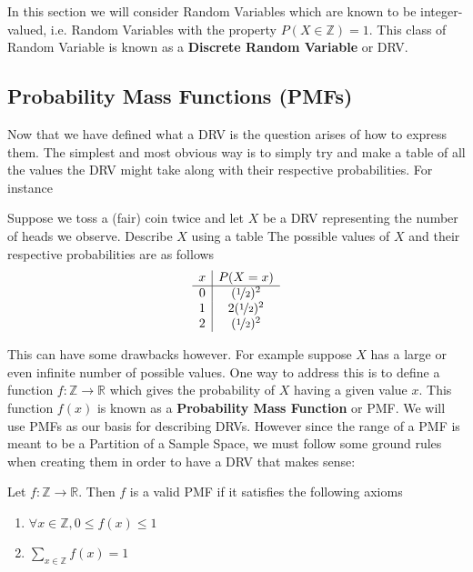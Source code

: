 \documentclass{report}
\begin{document}
In this section we will consider Random Variables which are known to be integer-valued, i.e. Random Variables with the property $P(X\in\mathbb Z)=1$. This class of Random Variable is known as a \textbf{Discrete Random Variable} or DRV.

\subsection{Probability Mass Functions (PMFs)}
Now that we have defined what a DRV is the question arises of how to express them. The simplest and most obvious way is to simply try and make a table of all the values the DRV might take along with their respective probabilities. For instance
\begin{example}
    Suppose we toss a (fair) coin twice and let $X$ be a DRV representing the number of heads we observe. Describe $X$ using a table
    \solution
    The possible values of $X$ and their respective probabilities are as follows
        \[
            \begin{array}{c|c}
                x & P(X=x) \\
                \hline
                0 & (\nicefrac 12)^2 \\
                1 & 2(\nicefrac 12)^2 \\
                2 & (\nicefrac 12)^2 
            \end{array}
        \]
\end{example}
This can have some drawbacks however. For example suppose $X$ has a large or even infinite number of possible values. One way to address this is to define a function $f: \mathbb Z\to \mathbb R$ which gives the probability of $X$ having a given value $x$. This function $f(x)$ is known as a \textbf{Probability Mass Function} or PMF. We will use PMFs as our basis for describing DRVs. However since the range of a PMF is meant to be a Partition of a Sample Space, we must follow some ground rules when creating them in order to have a DRV that makes sense:
\begin{definition}
    Let $f:\mathbb Z\to \mathbb R$. Then $f$ is a valid PMF if it satisfies the following axioms 
    \begin{enumerate}
        \item $\forall x\in\mathbb Z, 0\le f(x) \le 1$
        \item $\displaystyle\sum_{x\in\mathbb Z} f(x)= 1$
    \end{enumerate}
\end{definition}
\end{document}
